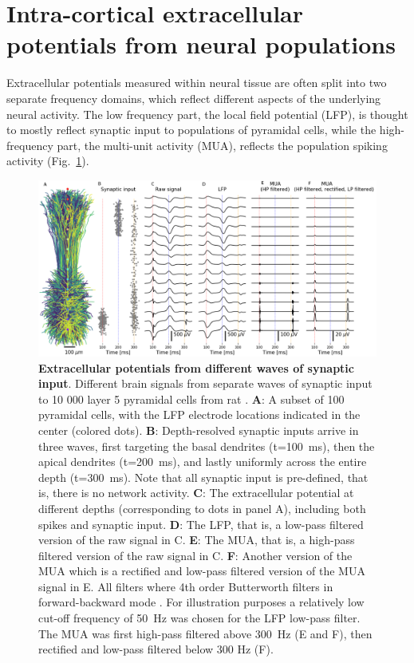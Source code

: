 \documentclass[preprint,11pt,authoryear]{elsarticle}
\begin{document}
\section{Intra-cortical extracellular potentials from neural populations}
Extracellular potentials measured within neural tissue are often split into two separate frequency domains, which reflect different aspects of the underlying neural activity. 
The low frequency part, the local field potential (LFP), is thought to mostly reflect synaptic input to populations of pyramidal cells, while the high-frequency part, the multi-unit activity (MUA), reflects the population spiking activity (Fig.~\ref{fig:LFP_MUA}).

\begin{figure}[!ht]
\begin{center}
\includegraphics[width=1\textwidth]{population_LFP_MUA.png}
\end{center}
\caption{\textbf{Extracellular potentials from different waves of synaptic input}. Different brain signals from separate waves of synaptic input to 10 000 layer 5 pyramidal cells from rat \citep{Hay2011}.
{\bf A}: A subset of 100 pyramidal cells, with the LFP electrode locations indicated in the center (colored dots).
{\bf B}: Depth-resolved synaptic inputs arrive in three waves, first targeting the basal dendrites (t=100~ms), then the apical dendrites (t=200~ms), and lastly uniformly across the entire depth (t=300~ms). Note that all synaptic input is pre-defined, that is, there is no network activity.
{\bf C}: The extracellular potential at different depths (corresponding to dots in panel A), including both spikes and synaptic input.
{\bf D}: The LFP, that is, a low-pass filtered version of the raw signal in C. 
{\bf E}: The MUA, that is, a high-pass filtered version of the raw signal in C.
{\bf F}: Another version of the MUA which is a rectified and low-pass filtered version of the MUA signal in E.
All filters where 4th order Butterworth filters in forward-backward mode \citep{NeuroEnsamble2017}. For illustration purposes a relatively low cut-off frequency of 50~Hz was chosen for the LFP low-pass filter. The MUA was first high-pass filtered above 300~Hz (E and F), then rectified and low-pass filtered below 300 Hz (F).
}
\label{fig:LFP_MUA}
\end{figure}
\end{document}
